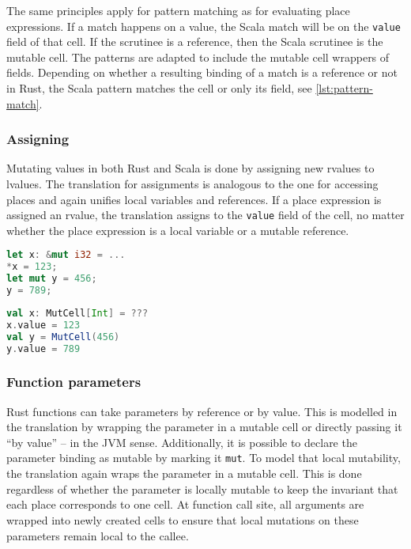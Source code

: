 The same principles apply for pattern matching as for evaluating place
expressions. If a match happens on a value, the Scala match will be on the
\passthrough{\lstinline!value!} field of that cell. If the scrutinee is a
reference, then the Scala scrutinee is the mutable cell. The patterns are
adapted to include the mutable cell wrappers of fields. Depending on whether a
resulting binding of a match is a reference or not in Rust, the Scala pattern
matches the cell or only its field, see \autoref{lst:pattern-match}.


\subsubsection{Assigning}

Mutating values in both Rust and Scala is done by assigning new rvalues
to lvalues. The translation for assignments is analogous to the one for
accessing places and again unifies local variables and references. If a
place expression is assigned an rvalue, the translation assigns to the
\passthrough{\lstinline!value!} field of the cell, no matter whether the
place expression is a local variable or a mutable reference.

\noindent\begin{minipage}[t]{.45\textwidth}
\begin{lstlisting}[language=Rust]
let x: &mut i32 = ...
*x = 123;
let mut y = 456;
y = 789;
\end{lstlisting}
\end{minipage}\hfill
\begin{minipage}[t]{.45\textwidth}
\begin{lstlisting}[language=Scala]
val x: MutCell[Int] = ???
x.value = 123
val y = MutCell(456)
y.value = 789
\end{lstlisting}
\end{minipage}

\subsubsection{Function parameters}

Rust functions can take parameters by reference or by value. This is modelled in
the translation by wrapping the parameter in a mutable cell or directly passing
it ``by value'' -- in the JVM sense. Additionally, it is possible to declare the
parameter binding as mutable by marking it \passthrough{\lstinline!mut!}. To
model that local mutability, the translation again wraps the parameter in a
mutable cell. This is done regardless of whether the parameter is locally
mutable to keep the invariant that each place corresponds to one cell. At
function call site, all arguments are wrapped into newly created cells to ensure
that local mutations on these parameters remain local to the callee.

